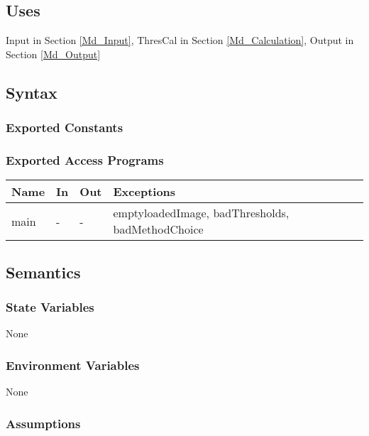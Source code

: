 \documentclass[12pt, titlepage]{article}
\begin{document}
\subsection{Uses}

Input in Section \ref{Md_Input}, ThresCal in Section \ref{Md_Calculation},
Output in Section \ref{Md_Output}

\subsection{Syntax}

\subsubsection{Exported Constants}

\subsubsection{Exported Access Programs}

\begin{center}
\begin{tabular}{p{2cm} p{2cm} p{2cm} p{6cm}}
\hline
\textbf{Name} & \textbf{In} & \textbf{Out} & \textbf{Exceptions} \\
\hline
main & - & - & emptyloadedImage, badThresholds, badMethodChoice\\
\hline
\end{tabular}
\end{center}

\subsection{Semantics}

\subsubsection{State Variables}

None

\subsubsection{Environment Variables}

None

\subsubsection{Assumptions}
\end{document}
